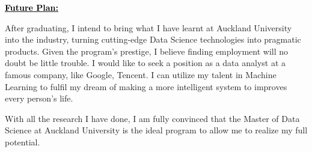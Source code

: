 \documentclass{article}
\newcommand{\statement}[1]{\par\medskip
  \underline{\textcolor{black}{\textbf{#1:}}}\space
}
\begin{document}
\statement{Future Plan}

After graduating, I intend to bring what I have learnt at Auckland University into the industry, turning cutting-edge Data Science technologies into pragmatic products. Given the program's prestige, I believe finding employment will no doubt be little trouble. I would like to seek a position as a data analyst at a famous company, like Google, Tencent. I can utilize my talent in Machine Learning to fulfil my dream of making a more intelligent system to improves every person's life.

With all the research I have done, I am fully convinced that the Master of Data Science at Auckland University is the ideal program to allow me to realize my full potential.
\end{document}
